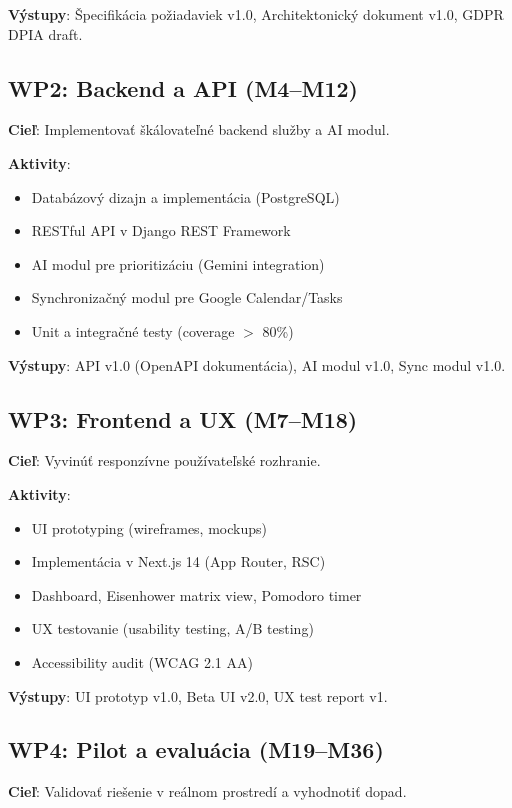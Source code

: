 \documentclass[10pt,twocolumn,twoside,slovak,a4paper]{article}
\begin{document}
\textbf{Výstupy}: Špecifikácia požiadaviek v1.0, Architektonický dokument v1.0, GDPR DPIA draft.

\subsection{WP2: Backend a API (M4--M12)}

\textbf{Cieľ}: Implementovať škálovateľné backend služby a AI modul.

\textbf{Aktivity}:
\begin{itemize}
\item Databázový dizajn a implementácia (PostgreSQL)
\item RESTful API v Django REST Framework
\item AI modul pre prioritizáciu (Gemini integration)
\item Synchronizačný modul pre Google Calendar/Tasks
\item Unit a integračné testy (coverage $>$ 80\%)
\end{itemize}

\textbf{Výstupy}: API v1.0 (OpenAPI dokumentácia), AI modul v1.0, Sync modul v1.0.

\subsection{WP3: Frontend a UX (M7--M18)}

\textbf{Cieľ}: Vyvinúť responzívne používateľské rozhranie.

\textbf{Aktivity}:
\begin{itemize}
\item UI prototyping (wireframes, mockups)
\item Implementácia v Next.js 14 (App Router, RSC)
\item Dashboard, Eisenhower matrix view, Pomodoro timer
\item UX testovanie (usability testing, A/B testing)
\item Accessibility audit (WCAG 2.1 AA)
\end{itemize}

\textbf{Výstupy}: UI prototyp v1.0, Beta UI v2.0, UX test report v1.

\subsection{WP4: Pilot a evaluácia (M19--M36)}

\textbf{Cieľ}: Validovať riešenie v reálnom prostredí a vyhodnotiť dopad.
\end{document}
